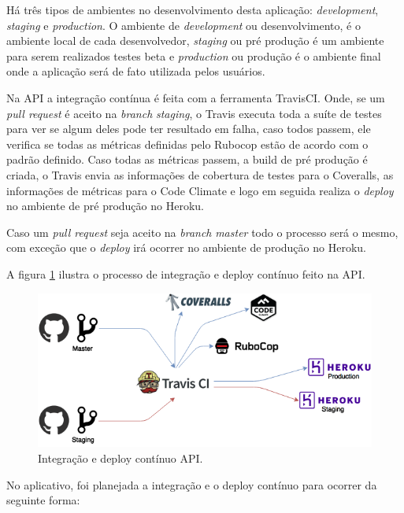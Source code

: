 Há três tipos de ambientes no desenvolvimento desta aplicação: \textit{development}, \textit{staging} e \textit{production}. O ambiente de \textit{development} ou desenvolvimento, é o ambiente local de cada desenvolvedor, \textit{staging} ou pré produção é um ambiente para serem realizados testes beta e \textit{production} ou produção é o ambiente final onde a aplicação será de fato utilizada pelos usuários.

Na API a integração contínua é feita com a ferramenta TravisCI. Onde, se um \textit{pull request} é aceito na \textit{branch} \textit{staging}, o Travis executa toda a suíte de testes para ver se algum deles pode ter resultado em falha, caso todos passem, ele verifica se todas as métricas definidas pelo Rubocop estão de acordo com o padrão definido. Caso todas as métricas passem, a build de pré produção é criada, o Travis envia as informações de cobertura de testes para o Coveralls, as informações de métricas para o Code Climate e logo em seguida realiza o \textit{deploy} no ambiente de pré produção no Heroku.

Caso um \textit{pull request} seja aceito na \textit{branch} \textit{master} todo o processo será o mesmo, com exceção que o \textit{deploy} irá ocorrer no ambiente de produção no Heroku.

A figura \ref{img:integracao_deploy_continuo_api} ilustra o processo de integração e deploy contínuo feito na API.

\begin{figure}[H]
    \centering
    \includegraphics[scale=0.5]{figuras/api_ci.png}
    \caption[Integração e deploy contínuo API]{Integração e deploy contínuo API.}
    \label{img:integracao_deploy_continuo_api}
\end{figure}

No aplicativo, foi planejada a integração e o deploy contínuo para ocorrer da seguinte forma:

